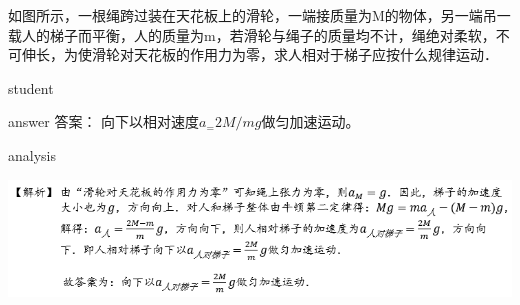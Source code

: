 \begin{example}
	如图所示，一根绳跨过装在天花板上的滑轮，一端接质量为M的物体，另一端吊一载人的梯子而平衡，人的质量为m，若滑轮与绳子的质量均不计，绳绝对柔软，不可伸长，为使滑轮对天花板的作用力为零，求人相对于梯子应按什么规律运动．
	
	\begin{taggedblock}{student}
		\vspace*{2cm}
	\end{taggedblock}
	
	
	\begin{taggedblock}{answer}
		答案： 向下以相对速度$a_=2M/m g$做匀加速运动。
	\end{taggedblock}
	
	
	\begin{taggedblock}{analysis}
			\begin{center}
				\includegraphics[width=0.9\linewidth]{image/newton-9}
			\end{center}
	\end{taggedblock}
\end{example}


